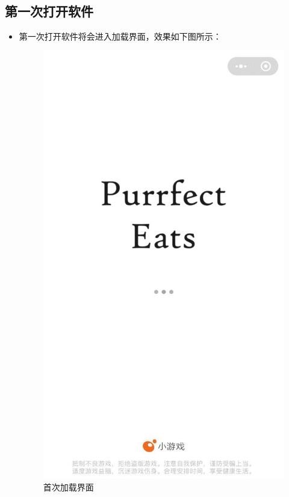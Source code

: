 \documentclass{mancls}%
\begin{document}
\subsection{第一次打开软件}

\begin{itemize}
  \item 第一次打开软件将会进入加载界面，效果如下图所示：
        \begin{figure}[h]
          \centering
          \includegraphics[height=0.6\textheight]{screenshots/minigame.jpg}
          \caption{首次加载界面}
        \end{figure}
\end{itemize}
\end{document}
